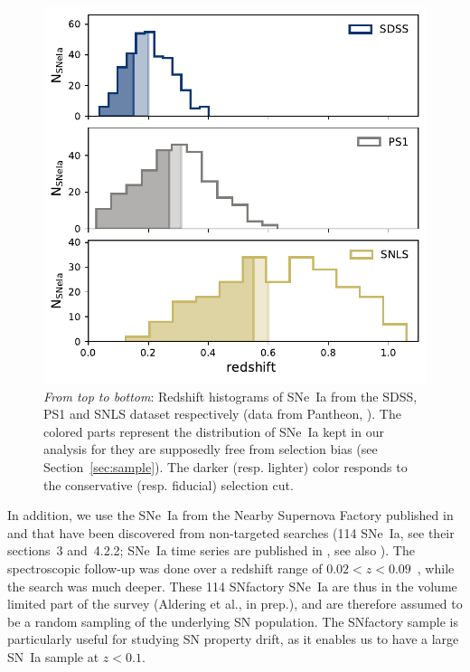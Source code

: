 \documentclass[]{aa}
\begin{document}
\begin{figure}
    \centering
    \includegraphics[width=0.95\linewidth]{Article_figures/hist_surveys_cuts_55-cividis.pdf}
    \caption{\textit{From top to bottom}: Redshift histograms of SNe~Ia from
        the SDSS, PS1 and SNLS dataset respectively (data from Pantheon,
        \citealt{scolnic2018a}). The colored parts represent the distribution
        of SNe~Ia kept in our analysis for they are supposedly free from
        selection bias (see Section~\ref{sec:sample}). The darker (resp. lighter)
        color responds to the conservative (resp. fiducial) selection cut.}
    \label{fig:cuts}
\end{figure}

In addition, we use the SNe~Ia from the Nearby Supernova Factory
\citep[SNfactory,][]{aldering2002} published in \cite{rigault2018} and that have
been discovered from non-targeted searches (114 SNe~Ia, see their sections~3
and~4.2.2; SNe~Ia time series are published in \citealt{saunders2020}, see also
\citealt{aldering2020}). The spectroscopic follow-up was done over a redshift
range of $0.02 < z < 0.09$~\citep[as in][]{rigault2018}, while the search was
much deeper. These 114 SNfactory SNe~Ia are thus in the volume limited part
of the survey (Aldering et al., in prep.), and are therefore assumed to be a
random sampling of the underlying SN population. The SNfactory sample is
particularly useful for studying SN property drift, as it enables us to have a
large SN~Ia sample at $z<0.1$.  
\end{document}
